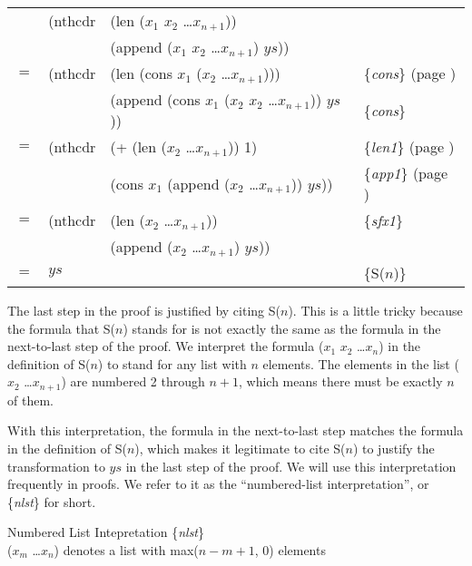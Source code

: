 \begin{center}
\begin{tabular}{llll}
    & (nthcdr & (len ($x_1$ $x_2$ \dots $x_{n+1}$))          & \\
    &         & (append ($x_1$ $x_2$ \dots $x_{n+1}$) $ys$)) & \\
$=$ & (nthcdr & (len (cons $x_1$ ($x_2$ \dots $x_{n+1}$)))          & \{\emph{cons}\} (page \pageref{cons-axiom-informal}) \\
    &         & (append (cons $x_1$ ($x_2$ $x_2$ \dots $x_{n+1}$)) $ys$)) & \{\emph{cons}\}                                    \\
$=$ & (nthcdr & (+ (len ($x_2$ \dots $x_{n+1}$)) 1)                 & \{\emph{len1}\} (page \pageref{len-equations})       \\
    &         & (cons $x_1$ (append ($x_2$ \dots $x_{n+1}$)) $ys$)) & \{\emph{app1}\} (page \pageref{append-equations})    \\
$=$ & (nthcdr & (len ($x_2$ \dots $x_{n+1}$))                       & \{\emph{sfx1}\}                                          \\
    &         & (append ($x_2$ \dots $x_{n+1}$) $ys$))              &                                                          \\
$=$ & $ys$    &                                                     & \{S($n$)\}                                              \\
\end{tabular}
\end{center}

The last step in the proof is justified by citing S($n$). 
This is a little tricky because the formula that S($n$) 
stands for is not exactly the same as the formula in the next-to-last step of the proof. 
We interpret the formula ($x_1$ $x_2$ \dots $x_n$) in the definition of S($n$) 
to stand for any list with $n$ elements. 
The elements in the list ($x_2$ \dots $x_{n+1}$) are numbered 2 through $n+1$, 
which means there must be exactly $n$ of them.

With this interpretation, the formula in the next-to-last step 
matches the formula in the definition of S($n$), 
which makes it legitimate to cite S($n$) to justify 
the transformation to $ys$ in the last step of the proof. 
We will use this interpretation frequently in proofs. 
We refer to it as the ``numbered-list interpretation'', or \{\emph{nlst}\} for short.

\label{numbered-list-interpretation}
\begin{center}
Numbered List Intepretation \{\emph{nlst}\} \\
($x_m$ \dots $x_n$) denotes a list with max($n-m+1$, 0) elements
\end{center}


